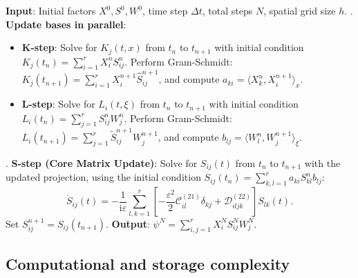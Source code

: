 \documentclass[preprint,11pt]{elsarticle}
\begin{document}
\begin{algorithm}[htbp]
    \caption{The unconventional integrator for the semiclassical Schrödinger equation with uncertainties}
    \label{alg: UI_integrator_Schrodinger}
    \begin{algorithmic}[1]
        \STATE \textbf{Input}: Initial factors $X^0, S^0, W^0$, time step $\Delta t$, total steps $N$, spatial grid size $h$.
            . \textbf{Update bases in parallel}:
            \begin{itemize}
                \item \textbf{K-step}: Solve for $K_j(t,x)$ from $t_n$ to $t_{n+1}$ with initial condition $K_j(t_n) = \sum_{i=1}^r X_i^n S_{ij}^n$. 
                Perform Gram-Schmidt: $K_j(t_{n+1}) = \sum_{i=1}^r X_i^{n+1} \widehat{S}_{ij}^{n+1}$, and compute $a_{ki} = \langle X_k^n, X_i^{n+1} \rangle_x$.
                
                \item \textbf{L-step}: Solve for $L_i(t,\xi)$ from $t_n$ to $t_{n+1}$ with initial condition $L_i(t_n) = \sum_{j=1}^r S_{ij}^n W_j^n$. 
                Perform Gram-Schmidt: $L_i(t_{n+1}) = \sum_{j=1}^r \widetilde{S}_{ij}^{n+1} W_j^{n+1}$, and compute $b_{lj} = \langle W_l^n, W_j^{n+1} \rangle_\xi$.
            \end{itemize}
            
            . \textbf{S-step (Core Matrix Update)}:
            Solve for $S_{ij}(t)$ from $t_n$ to $t_{n+1}$ with the updated projection, using the initial condition $S_{ij}(t_n) = \sum_{k,l=1}^r a_{ki} S_{kl}^n b_{lj}$:
            \begin{equation*}
                \dot{S}_{ij}(t) = -\frac{1}{\mathrm{i}\varepsilon} \sum_{l,k=1}^r \left[ -\frac{\varepsilon^2}{2} \mathcal{C}_{il}^{(21)} \delta_{kj} + \mathcal{D}_{iljk}^{(22)} \right] S_{lk}(t).
            \end{equation*}
            Set $S_{ij}^{n+1} = S_{ij}(t_{n+1})$.
        \ENDFOR
        \STATE \textbf{Output}: $\psi^N = \sum_{i,j=1}^r X_i^N S_{ij}^N W_j^N$.
    \end{algorithmic}
\end{algorithm}



\subsection{Computational and storage complexity}
\end{document}
